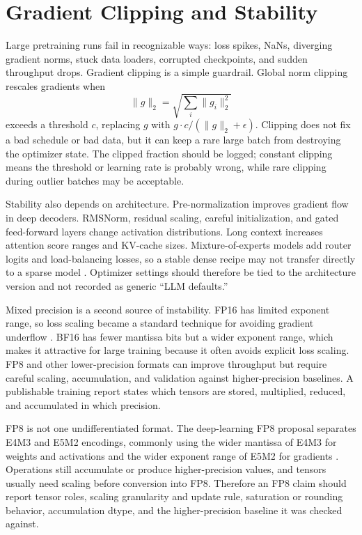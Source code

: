 \section{Gradient Clipping and Stability}
\label{sec:clipping-stability}

Large pretraining runs fail in recognizable ways: loss spikes, NaNs, diverging gradient norms, stuck data loaders, corrupted checkpoints, and sudden throughput drops. Gradient clipping is a simple guardrail. Global norm clipping rescales gradients when
\begin{equation}
  \|g\|_2 = \sqrt{\sum_i \|g_i\|_2^2}
\end{equation}
exceeds a threshold $c$, replacing $g$ with $g \cdot c/(\|g\|_2+\epsilon)$. Clipping does not fix a bad schedule or bad data, but it can keep a rare large batch from destroying the optimizer state. The clipped fraction should be logged; constant clipping means the threshold or learning rate is probably wrong, while rare clipping during outlier batches may be acceptable.

Stability also depends on architecture. Pre-normalization improves gradient flow in deep decoders. RMSNorm, residual scaling, careful initialization, and gated feed-forward layers change activation distributions. Long context increases attention score ranges and KV-cache sizes. Mixture-of-experts models add router logits and load-balancing losses, so a stable dense recipe may not transfer directly to a sparse model \cite{deepseek2024v3}. Optimizer settings should therefore be tied to the architecture version and not recorded as generic ``LLM defaults.''

Mixed precision is a second source of instability. FP16 has limited exponent range, so loss scaling became a standard technique for avoiding gradient underflow \cite{micikevicius2017mixed}. BF16 has fewer mantissa bits but a wider exponent range, which makes it attractive for large \transformer training because it often avoids explicit loss scaling. FP8 and other lower-precision formats can improve throughput but require careful scaling, accumulation, and validation against higher-precision baselines. A publishable training report states which tensors are stored, multiplied, reduced, and accumulated in which precision.

FP8 is not one undifferentiated format. The deep-learning FP8 proposal separates E4M3 and E5M2 encodings, commonly using the wider mantissa of E4M3 for weights and activations and the wider exponent range of E5M2 for gradients \cite{micikevicius2022fp8}. Operations still accumulate or produce higher-precision values, and tensors usually need scaling before conversion into FP8. Therefore an FP8 claim should report tensor roles, scaling granularity and update rule, saturation or rounding behavior, accumulation dtype, and the higher-precision baseline it was checked against.

